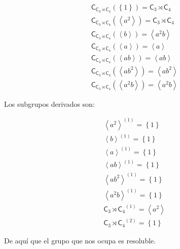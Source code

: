 \documentclass[12pt,a4paper,fleqn,spanish,final,openright]{extbook}
\theoremstyle{definition}
\theoremstyle{remark}
\begin{document}
\begin{align*}
&{\mathsf{C}_{{{{\mathsf{C}}_{3}}\rtimes{{\mathsf{C}}_{4}}}}}
\left({\left\lbrace{1}\right\rbrace}\right) = 
{{{\mathsf{C}}_{3}}\rtimes{{\mathsf{C}}_{4}}}\\
&{\mathsf{C}_{{{{\mathsf{C}}_{3}}\rtimes{{\mathsf{C}}_{4}}}}}
\left({\left\langle{a^2}\right\rangle}\right) = 
{{{\mathsf{C}}_{3}}\rtimes{{\mathsf{C}}_{4}}}\\
&{\mathsf{C}_{{{{\mathsf{C}}_{3}}\rtimes{{\mathsf{C}}_{4}}}}}
\left({\left\langle{b}\right\rangle}\right) = 
{\left\langle{a^2b}\right\rangle}\\
&{\mathsf{C}_{{{{\mathsf{C}}_{3}}\rtimes{{\mathsf{C}}_{4}}}}}
\left({\left\langle{a}\right\rangle}\right) = 
{\left\langle{a}\right\rangle}\\
&{\mathsf{C}_{{{{\mathsf{C}}_{3}}\rtimes{{\mathsf{C}}_{4}}}}}
\left({\left\langle{ab}\right\rangle}\right) = 
{\left\langle{ab}\right\rangle}\\
&{\mathsf{C}_{{{{\mathsf{C}}_{3}}\rtimes{{\mathsf{C}}_{4}}}}}
\left({\left\langle{ab^2}\right\rangle}\right) = 
{\left\langle{ab^2}\right\rangle}\\
&{\mathsf{C}_{{{{\mathsf{C}}_{3}}\rtimes{{\mathsf{C}}_{4}}}}}
\left({\left\langle{a^2b}\right\rangle}\right) = 
{\left\langle{a^2b}\right\rangle}
\end{align*}

Los subgrupos derivados son:

\begin{align*}
&{\left\langle{a^2}\right\rangle}^{(1)} = {\left\lbrace{1}\right\rbrace}\\
&{\left\langle{b}\right\rangle}^{(1)} = {\left\lbrace{1}\right\rbrace}\\
&{\left\langle{a}\right\rangle}^{(1)} = {\left\lbrace{1}\right\rbrace}\\
&{\left\langle{ab}\right\rangle}^{(1)} = {\left\lbrace{1}\right\rbrace}\\
&{\left\langle{ab^2}\right\rangle}^{(1)} = {\left\lbrace{1}\right\rbrace}\\
&{\left\langle{a^2b}\right\rangle}^{(1)} = {\left\lbrace{1}\right\rbrace}\\
&{{{\mathsf{C}}_{3}}\rtimes{{\mathsf{C}}_{4}}}^{(1)} ={\left\langle{a^2}\right\rangle}\\
&{{{\mathsf{C}}_{3}}\rtimes{{\mathsf{C}}_{4}}}^{(2)} ={\left\lbrace{1}\right\rbrace}
\end{align*}

De aquí que el grupo que nos ocupa es resoluble.
\end{document}
